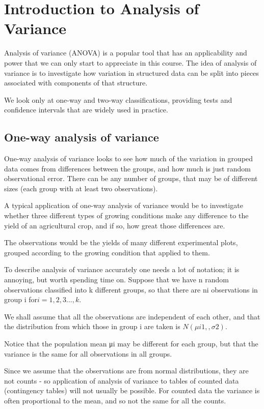 

\section{Introduction to Analysis of Variance}

Analysis of variance (ANOVA) is a popular tool that has an applicability and power that we can only start to appreciate in this course. The idea of analysis of variance is to investigate how variation in structured data can be split into pieces associated with components of that structure. 

We look only at one-way and two-way classifications, providing tests and confidence intervals that are widely used in practice.

\subsection{One-way analysis of variance}
One-way analysis of variance looks to see how much of the variation in grouped data comes from differences between the groups, and how much is just random observational error. There can be any number of groups, that may be of different sizes (each group with at least two observations). 

A typical application of one-way analysis of variance would be to investigate whether three different types of growing conditions make any difference to the yield of an agricultural crop, and if so, how great those differences are. 

The observations would be the yields of many different experimental plots, grouped according to the growing condition that applied to them.


To describe analysis of variance accurately one needs a lot of notation; it is annoying, but worth spending time on. Suppose that we have n random observations classified into k different groups, so that there are ni observations in group i for$ i = 1, 2, 3. . . , k$. 

We shall assume that all the observations are independent of each other, and that the distribution from which those in group i are taken is $N(μi 1, , σ2)$. 

Notice that the population mean μi may be different for each group, but that the variance is the same for all observations in all groups. 

Since we assume that the observations are from normal distributions, they are not counts - so application of analysis of variance to tables of counted data (contingency tables) will not usually be possible. For counted data the variance is often proportional to the mean, and so not the same for all the counts. 

